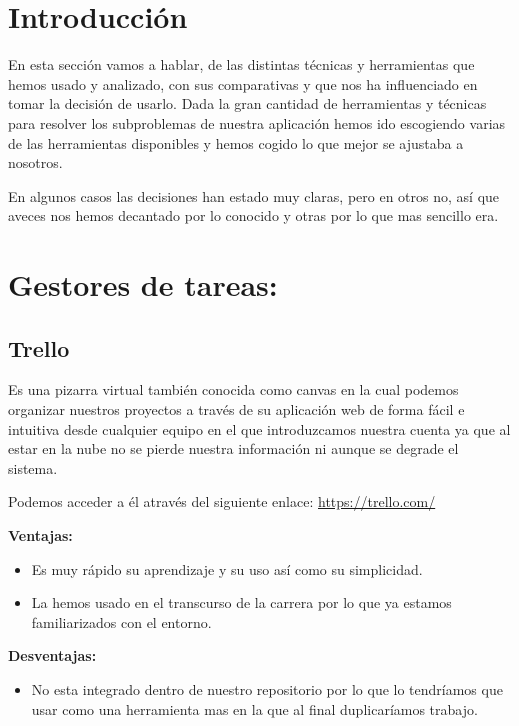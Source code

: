 
\section{Introducción}
En esta sección vamos a hablar, de las distintas técnicas y herramientas que hemos usado y analizado, con sus comparativas y que nos ha influenciado en tomar la decisión de usarlo.
Dada la gran cantidad de herramientas y técnicas para resolver los subproblemas de nuestra aplicación hemos ido escogiendo varias de las herramientas disponibles y hemos cogido lo que mejor se ajustaba a nosotros.

En algunos casos las decisiones han estado muy claras, pero en otros no, así que aveces nos hemos decantado por lo conocido y otras por lo que mas sencillo era.

\section{Gestores de tareas:}
\subsection{Trello}
Es una pizarra virtual también conocida como canvas en la cual podemos organizar nuestros proyectos a través de su aplicación web de forma fácil e intuitiva desde cualquier equipo en el que introduzcamos nuestra cuenta ya que al estar en la nube no se pierde nuestra información ni aunque se degrade el sistema.

Podemos acceder a él através del siguiente enlace: 
\url{https://trello.com/}



\textbf{Ventajas:}

\begin{itemize}
\item Es muy rápido su aprendizaje y su uso así como su simplicidad.

\item La hemos usado en el transcurso de la carrera por lo que ya estamos familiarizados con el entorno.
\end{itemize}

\textbf{Desventajas:}

\begin{itemize}
\item No esta integrado dentro de nuestro repositorio por lo que lo tendríamos que usar como una herramienta mas en la que al final duplicaríamos trabajo.
\end{itemize}


